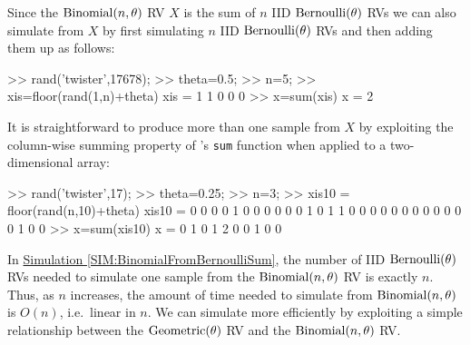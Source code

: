 \begin{simulation}[$\binomial(n,\theta)$ as $\sum_{i=1}^n \bernoulli(\theta)$]\label{SIM:BinomialFromBernoulliSum}
Since the $\binomial(n,\theta)$ RV $X$ is the sum of $n$ IID $\mbox{{\rm Bernoulli}}(\theta)$ RVs we can also simulate from $X$ by first simulating $n$ IID $\mbox{{\rm Bernoulli}}(\theta)$ RVs and then adding them up as follows:
\begin{VrbM}
>> rand('twister',17678);
>> theta=0.5; %
>> n=5; %
>> xis=floor(rand(1,n)+theta) %
xis =     1     1     0     0     0
>> x=sum(xis) %
x =     2
\end{VrbM}
It is straightforward to produce more than one sample from $X$ by exploiting the column-wise summing property of \Matlab's {\tt sum} function when applied to a two-dimensional array:
\begin{VrbM}
>> rand('twister',17);
>> theta=0.25; %
>> n=3; %
>> xis10 = floor(rand(n,10)+theta) %
xis10 =
     0     0     0     0     1     0     0     0     0     0
     0     1     0     1     1     0     0     0     0     0
     0     0     0     0     0     0     0     1     0     0
>> x=sum(xis10) %
x =     0     1     0     1     2     0     0     1     0     0
\end{VrbM}
\end{simulation}

In \hyperref[SIM:BinomialFromBernoulliSum]{Simulation \ref*{SIM:BinomialFromBernoulliSum}}, the number of IID $\mbox{{\rm Bernoulli}}(\theta)$ RVs needed to simulate one sample from the $\binomial(n,\theta)$ RV is exactly $n$.  Thus, as $n$ increases, the amount of time needed to simulate from $\binomial(n,\theta)$ is $O(n)$, i.e.~linear in $n$.  We can simulate more efficiently by exploiting a simple relationship between the $\mbox{{\rm Geometric}}(\theta)$ RV and the $\binomial(n,\theta)$ RV.

